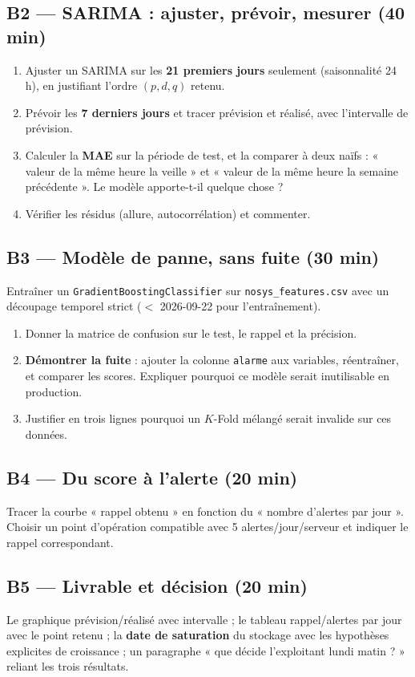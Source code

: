 \documentclass[11pt,a4paper]{article}
\newcommand{\py}[1]{\texttt{\small #1}}
\newcommand{\file}[1]{\texttt{\small #1}}
\begin{document}
\subsection*{B2 --- SARIMA : ajuster, prévoir, mesurer (40 min)}
\begin{enumerate}
\item Ajuster un SARIMA sur les \textbf{21 premiers jours} seulement
(saisonnalité 24 h), en justifiant l'ordre $(p,d,q)$ retenu.
\item Prévoir les \textbf{7 derniers jours} et tracer prévision et réalisé,
avec l'intervalle de prévision.
\item Calculer la \textbf{MAE} sur la période de test, et la comparer à deux
naïfs : « valeur de la même heure la veille » et « valeur de la même heure la
semaine précédente ». Le modèle apporte-t-il quelque chose ?
\item Vérifier les résidus (allure, autocorrélation) et commenter.
\end{enumerate}

\subsection*{B3 --- Modèle de panne, sans fuite (30 min)}
Entraîner un \py{GradientBoostingClassifier} sur \file{nosys\_features.csv}
avec un découpage temporel strict ($<$ 2026-09-22 pour l'entraînement).
\begin{enumerate}
\item Donner la matrice de confusion sur le test, le rappel et la précision.
\item \textbf{Démontrer la fuite} : ajouter la colonne \py{alarme} aux
variables, réentraîner, et comparer les scores. Expliquer pourquoi ce modèle
serait inutilisable en production.
\item Justifier en trois lignes pourquoi un $K$-Fold mélangé serait invalide
sur ces données.
\end{enumerate}

\subsection*{B4 --- Du score à l'alerte (20 min)}
Tracer la courbe « rappel obtenu » en fonction du « nombre d'alertes par
jour ». Choisir un point d'opération compatible avec 5 alertes/jour/serveur
et indiquer le rappel correspondant.

\subsection*{B5 --- Livrable et décision (20 min)}
\begin{rendre}
Le graphique prévision/réalisé avec intervalle ; le tableau
rappel/alertes par jour avec le point retenu ; la \textbf{date de saturation}
du stockage avec les hypothèses explicites de croissance ; un paragraphe
« que décide l'exploitant lundi matin ? » reliant les trois résultats.
\end{rendre}
\end{document}
